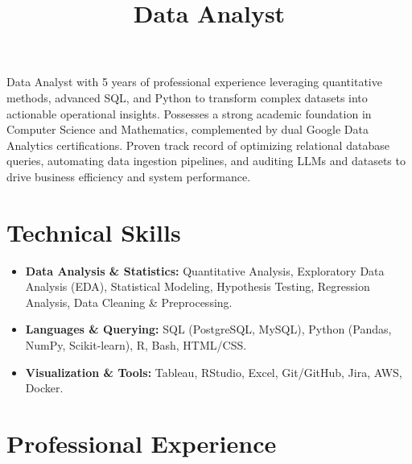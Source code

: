 \documentclass[11pt,a4paper,sans]{moderncv}
\title{Data Analyst}
\begin{document}
\makecvtitle

\vspace{-2em}
\small{Data Analyst with 5 years of professional experience leveraging quantitative methods, advanced SQL, and Python to transform complex datasets into actionable operational insights. Possesses a strong academic foundation in Computer Science and Mathematics, complemented by dual Google Data Analytics certifications. Proven track record of optimizing relational database queries, automating data ingestion pipelines, and auditing LLMs and datasets to drive business efficiency and system performance.}

\section{Technical Skills}
\begin{itemize}
    \item \textbf{Data Analysis \& Statistics:} Quantitative Analysis, Exploratory Data Analysis (EDA), Statistical Modeling, Hypothesis Testing, Regression Analysis, Data Cleaning \& Preprocessing.
    \item \textbf{Languages \& Querying:} SQL (PostgreSQL, MySQL), Python (Pandas, NumPy, Scikit-learn), R, Bash, HTML/CSS.
    \item \textbf{Visualization \& Tools:} Tableau, RStudio, Excel, Git/GitHub, Jira, AWS, Docker.
\end{itemize}

\section{Professional Experience}
\end{document}
